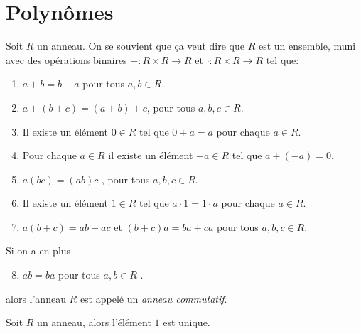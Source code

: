 
\chapter{Polynômes}
\label{cha:polynomes}

Soit $R$ un anneau. On se souvient que ça veut dire que  $R$ est un ensemble,  muni avec des opérations binaires  $+ : R × R → R$  et $⋅: R × R → R$ tel que: 
\begin{enumerate}[(R1)]
\item $a+ b  = b+a$ pour tous     $a,b ∈ R$. \label{R1}
\item $a + (b+c) = (a + b) +c$, pour tous $a,b,c ∈ R$. \label{R2}
\item Il existe un élément $0 ∈R$ tel que $0+a =a$ pour chaque $a ∈R$. \label{R3}
\item Pour chaque $a ∈R$ il existe un élément $-a ∈R$ tel que $a + (-a) = 0$. \label{R4}
\item $a(bc) = (ab) c$ , pour tous $a,b,c ∈ R$. \label{R5}
\item Il existe un élément $1 ∈R$ tel que $a ⋅ 1 = 1 ⋅a$ pour chaque $a ∈R$. \label{R6}
\item $a (b+c) = ab + ac$ et $(b+c) a =ba +ca$  pour tous $a,b,c ∈R$.\label{R7} 
\end{enumerate}
Si on a en plus
\begin{enumerate}[(R1)]
  \setcounter{enumi}{7}
\item  $a b = ba$ pour tous $a,b ∈R$ \label{R8}. 
\end{enumerate}
alors l'anneau $R$ est appelé un \emph{anneau commutatif}.

\begin{exercise}
  Soit $R$ un anneau, alors l'élément $1$ est unique. 
\end{exercise}

